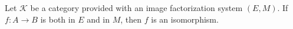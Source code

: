 Let $\mathcal{K}$ be a category provided with an image factorization system $(E, M)$. If $f: A \longrightarrow B$ is both in $E$ and in $M$, then $f$ is an isomorphism.
